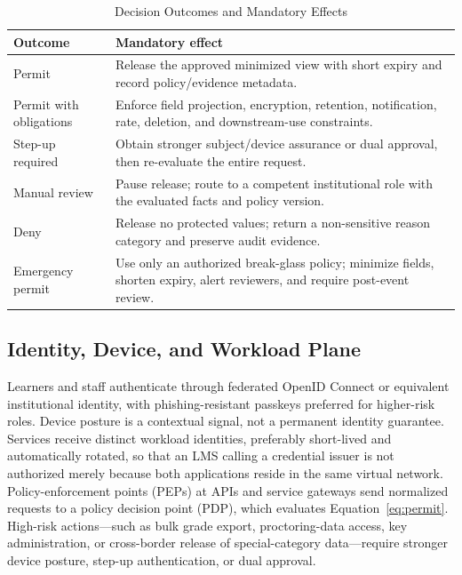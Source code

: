\documentclass[journal]{IEEEtran}
\newcommand{\THead}[1]{\cellcolor{TableHeader}\textbf{#1}}
\begin{document}
\begin{table}[t]
\caption{Decision Outcomes and Mandatory Effects}
\label{tab:outcomes}
\centering
\scriptsize
\begin{tabularx}{\columnwidth}{|p{}|Y|}
\hline
\THead{Outcome} & \THead{Mandatory effect} \\
\hline
Permit & Release the approved minimized view with short expiry and record policy/evidence metadata. \\
\hline
Permit with obligations & Enforce field projection, encryption, retention, notification, rate, deletion, and downstream-use constraints. \\
\hline
Step-up required & Obtain stronger subject/device assurance or dual approval, then re-evaluate the entire request. \\
\hline
Manual review & Pause release; route to a competent institutional role with the evaluated facts and policy version. \\
\hline
Deny & Release no protected values; return a non-sensitive reason category and preserve audit evidence. \\
\hline
Emergency permit & Use only an authorized break-glass policy; minimize fields, shorten expiry, alert reviewers, and require post-event review. \\
\hline
\end{tabularx}
\end{table}


\subsection{Identity, Device, and Workload Plane}
Learners and staff authenticate through federated OpenID Connect or equivalent institutional identity, with phishing-resistant passkeys preferred for higher-risk roles. Device posture is a contextual signal, not a permanent identity guarantee. Services receive distinct workload identities, preferably short-lived and automatically rotated, so that an LMS calling a credential issuer is not authorized merely because both applications reside in the same virtual network. Policy-enforcement points (PEPs) at APIs and service gateways send normalized requests to a policy decision point (PDP), which evaluates Equation~\eqref{eq:permit}. High-risk actions---such as bulk grade export, proctoring-data access, key administration, or cross-border release of special-category data---require stronger device posture, step-up authentication, or dual approval.
\end{document}
